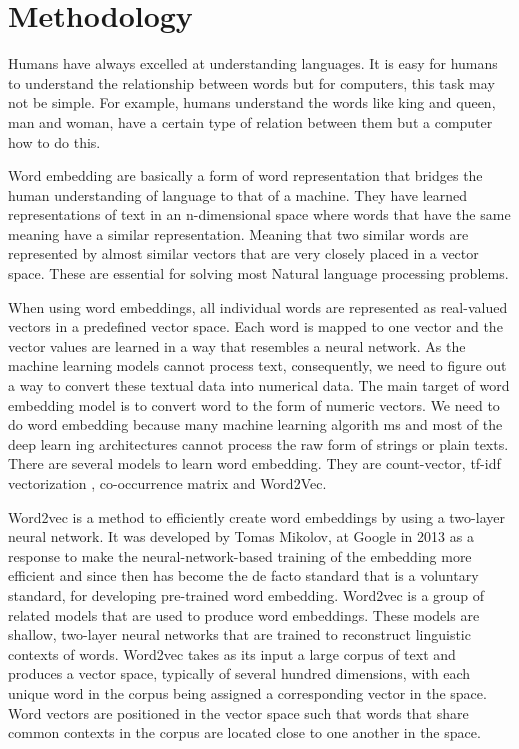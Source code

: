 \documentclass[conference]{IEEEtran}
\begin{document}
\section{Methodology}\label{Sec:Methodology}

Humans have always excelled at understanding languages. It is easy for humans to understand the relationship between words but for computers, this task may not be simple. For example, humans understand the words like king and queen, man and woman, have a certain type of relation between them but a computer how to do this.

Word embedding are basically a form of word representation that bridges the human understanding of language to that of a machine. They have learned representations of text in an n-dimensional space where words that have the same meaning have a similar representation. Meaning that two similar words are represented by almost similar vectors that are very closely placed in a vector space. These are essential for solving most Natural language processing problems.

When using word embeddings, all individual words are represented as real-valued vectors in a predefined vector space. Each word is mapped to one vector and the vector values are learned in a way that resembles a neural network. As the machine learning models cannot process text, consequently, we need to figure out a way to convert these textual data into numerical data. The main target of word embedding model is to convert word to the form of numeric vectors. We need to do word embedding because many machine learning algorith ms and most of the deep learn ing architectures cannot process the raw form of strings or plain texts. There are several models to learn word embedding.  They  are count-vector, tf-idf vectorization , co-occurrence matrix and Word2Vec.

Word2vec is a method to efficiently create word embeddings by using a two-layer neural network. It was developed by Tomas Mikolov, at Google in 2013 as a response to make the neural-network-based training of the embedding more efficient and since then has become the de facto standard that is a voluntary standard, for developing pre-trained word embedding. Word2vec is a group of related models that are used to produce word embeddings. These models are shallow, two-layer neural networks that are trained to reconstruct linguistic contexts of words. Word2vec takes as its input a large corpus of text and produces a vector space, typically of several hundred dimensions, with each unique word in the corpus being assigned a corresponding vector in the space. Word vectors are positioned in the vector space such that words that share common contexts in the corpus are located close to one another in the space.
\end{document}
